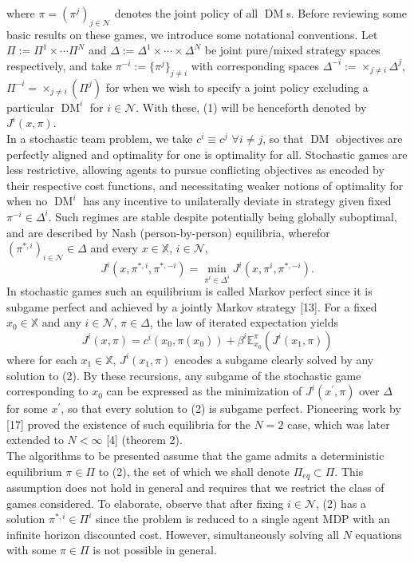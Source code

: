 \documentclass[10pt]{article}
\newcommand{\E}{\mathbb{E}}
\newcommand{\bp}[1]{\left({#1}\right)}
\newcommand{\mbb}[1]{\mathbb{#1}}
\newcommand{\1}[1]{\mathbbm{1}_{#1}}
\newcommand{\mc}[1]{\mathcal{#1}}
\DeclareMathOperator{\DM}{DM}
\begin{document}
where $\pi=(\pi^j)_{j\in\mc{N}}$ denotes the joint policy of all $\DM$s. Before reviewing some basic results on these games, we introduce some notational conventions. Let $\Pi:=\Pi^1\times\cdots\Pi^N$ and $\Delta:=\Delta^1\times\cdots\times\Delta^N$ be joint pure/mixed strategy spaces respectively, and take $\pi^{-i}:=\{\pi^j\}_{j\neq i}$ with corresponding spaces $\Delta^{-i}:=\times_{j\neq i}\Delta^j$, $\Pi^{-i}=\times_{j\neq i}(\Pi^j)$ for when we wish to specify a joint policy excluding a particular $\DM^i$ for $i\in\mc{N}$.
With these, (1) will be henceforth denoted by $J^i(x,\pi)$.\\[5pt]
In a stochastic team problem, we take $c^i\equiv c^j$ $\forall i\neq j$, so that $\DM$ objectives are perfectly aligned and optimality for one is optimality for all. Stochastic games are less restrictive,
allowing agents to pursue conflicting objectives as encoded by their respective cost functions, and necessitating weaker notions of optimality for when no $\DM^i$ has any incentive to unilaterally deviate in strategy given fixed $\pi^{-i}\in\Delta^i$. Such regimes are stable despite potentially being globally suboptimal, and are described by Nash (person-by-person) equilibria, wherefor $(\pi^{\ast,i})_{i\in\mc{N}}\in\Delta$ and every $x\in\mbb{X}$, $i\in\mc{N}$,
\[J^i(x,\pi^{\ast,i},\pi^{\ast,-i})=\min_{\pi^i\in\Delta^i}J^i(x,\pi^i,\pi^{\ast,-i}).\tag{2}\]
In stochastic games such an equilibrium is called Markov perfect since it is subgame perfect and achieved by a jointly Markov strategy [13]. For a fixed $x_0\in\mbb{X}$ and any $i\in\mc{N}$, $\pi\in\Delta$, the law of iterated expectation yields
\[J^i(x,\pi)=c^i(x_0,\pi(x_0))+\beta^i\E^\pi_{x_0}\bp{J^i(x_1,\pi)}\] 
where for each $x_1\in\mbb{X}$, $J^i(x_1,\pi)$ encodes a subgame clearly solved by any solution to (2). By these recursions, any subgame of the stochastic game corresponding to $x_0$ can be expressed as the minimization of $J^i(x^\prime,\pi)$ over $\Delta$ for some $x^\prime$, so that every solution to (2) is subgame perfect. Pioneering work by [17] proved the existence of such equilibria for the $N=2$ case, which was later extended to $N<\infty$ [4] (theorem 2).\\[5pt]
The algorithms to be presented assume that the game admits a deterministic equilibrium $\pi\in\Pi$ to (2), the set of which we shall denote $\Pi_{eq}\subset\Pi$. This assumption does not hold in general and requires that we restrict the class of games considered. To elaborate, observe that after fixing $i\in\mc{N}$, (2) has a solution $\pi^{\ast,i}\in\Pi^i$ since the problem is reduced to a single agent MDP with an infinite horizon discounted cost. However, simultaneously solving all $N$ equations with some $\pi\in\Pi$ is not possible in general.
\end{document}
